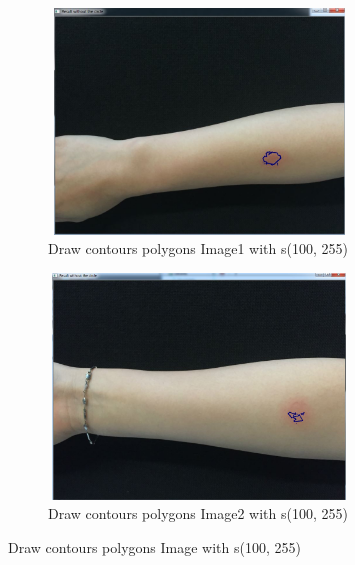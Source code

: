  \begin{figure}[!h]
\centering
\begin{subfigure}{.5\textwidth}
  \centering
  \includegraphics[width=8cm,height=6cm]{img/detectresult0circle}
  \caption{Draw contours polygons Image1 with s(100, 255)\cite{Bradski}}
  \label{fig:sub1}
\end{subfigure}%
\begin{subfigure}{.5\textwidth}
  \centering
  \includegraphics[width=8cm,height=6cm]{img/detectresult0circle2}
  \caption{Draw contours polygons Image2 with s(100, 255)}
  \label{fig:sub2}
\end{subfigure}
\caption{Draw contours polygons Image with s(100, 255)}
\label{fig:test}
\end{figure}

